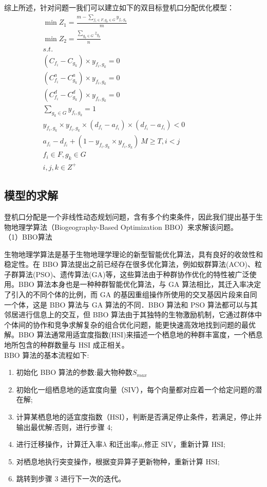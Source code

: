 \documentclass[bwprint]{gmcmthesis}
\numberwithin{figure}{section}
\begin{document}
综上所述，针对问题一我们可以建立如下的双目标登机口分配优化模型：
\begin{gather*}
\min Z_1=\frac{m-\sum\limits_{f_i\in F,g_k \in G} y_{f_i,g_k}}{m} \\
\min Z_2=\frac{\sum\limits_{g_k \in G} z_{g_k}}{n} \\
s.t. \hspace{10cm} \\
(C_{f_i}-C_{g_k} ) \times y_{f_i,g_k}=0  \\
(C_{f_i}^a - C_{g_k}^a ) \times y_{f_i,g_k}=0 \\
(C_{f_i}^d- C_{g_k}^d ) \times y_{f_i,g_k}=0 \\
\sum_{g_k \in G} y_{f_i,g_k}=1 \\
y_{f_i,g_k} \times y_{f_i,g_k} \times (d_{f_i}- a_{f_i}) \times  (d_{f_i}- a_{f_i}) < 0 \\
a_{f_i}-d_{f_i}+(1-y_{f_i,g_k} \times y_{f_i,g_k})\ M \ge T, i<j \\
f_i \in F, g_k \in G\\
i,j,k \in Z^{+}
\end{gather*}

\subsection{模型的求解}
登机口分配是一个非线性动态规划问题，含有多个约束条件\cite{narciso2015robust, 王笑天2015基于列生成算法的停机位指派的鲁棒性研究, 李军会2014基于航班延误分布的机位鲁棒指派模型}，因此我们提出基于生物地理学算法（Biogeography-Based Optimization BBO）来求解该问题。\\
（1）BBO算法  \par
生物地理学算法是基于生物地理学理论的新型智能优化算法，具有良好的收敛性和稳定性\cite{罗宇骁2016基于, 鲁宇明2016一种改进的生物地理学优化算法}。在 BBO 算法提出之前已经存在很多优化算法，例如蚁群算法(ACO)、粒子群算法(PSO)、遗传算法(GA)等，这些算法由于种群协作优化的特性被广泛使用。BBO 算法本身也是一种种群智能优化算法，与 GA 算法相比，其迁入率决定了引入的不同个体的比例，而 GA 的基因重组操作所使用的交叉基因片段来自同一个体，这是 BBO 算法与 GA 算法的不同．BBO 算法和 PSO 算法都可以与其邻居进行信息上的交互，但 BBO 算法由于其独特的生物激励机制，它通过群体中个体间的协作和竞争求解复杂的组合优化问题，能更快速高效地找到问题的最优解。BBO 算法通常用适宜度指数(HSI)来描述一个栖息地的种群丰富度，一个栖息地所包含的种群数量与 HSI 成正相关。 \\
BBO 算法的基本流程如下: \par
\begin{enumerate}[label={(\alph*)}]
\item 初始化 BBO 算法的参数:最大物种数$S_{max}$
\item 初始化一组栖息地的适宜度向量（SIV），每个向量都对应着一个给定问题的潜在解;
\item 计算某栖息地的适宜度指数（HSI），判断是否满足停止条件，若满足，停止并输出最优解;否则，进行步骤 4;
\item 进行迁移操作，计算迁入率$\lambda$ 和迁出率$\mu$,修正 SIV，重新计算 HSI;
\item 对栖息地执行突变操作，根据变异算子更新物种，重新计算 HSI;
\item 跳转到步骤 3 进行下一次的迭代。
\end{enumerate}
\end{document}

